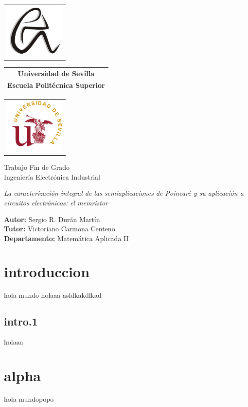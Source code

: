 \documentclass{article}
\begin{document}
	
	\begin{titlepage}
		\centering
		\hspace*{-1.5cm}\begin{tabular}{@{}l@{}}
			\includegraphics[width=3cm]{a.png} %
		\end{tabular}
		\hfill
		\begin{tabular}{c}
			\LARGE\textbf{Universidad de Sevilla} \\ [0.5cm] %
			\LARGE\textbf{Escuela Politécnica Superior} %
		\end{tabular}%
		\hfill
		\begin{tabular}{@{}r@{}}
			\includegraphics[width=3cm]{b.png} %
		\end{tabular}\hspace*{-1.5cm}
		
		\vspace{1.5cm}
		
		\begin{center}
			\Large\textmd{Trabajo Fin de Grado} \\ [0.5cm] %
			\Large\textmd{Ingeniería Electrónica Industrial}
		\end{center}
		
		\vspace{2cm}
		
		\begin{center}
			\LARGE\textsl{La caracterización integral de las semiaplicaciones de Poincaré y su aplicación a circuitos electrónicos: el memristor}
		\end{center}
		
		\vspace{6cm}
		
		\raggedright
		\large\textbf{Autor:} Sergio R. Durán Martín \\ [0.5cm]
		\large\textbf{Tutor:} Victoriano Carmona Centeno \\ [0.5cm]
		\large\textbf{Departamento:} Matemática Aplicada II
	\end{titlepage}
	
	\newpage
	\section{introduccion}
	hola mundo
	\newpage
	holaaa
	\newpage
	asldkakdlkad
	\newpage
	\subsection{intro.1}
	holaaa
	\newpage
	\section{alpha}
	hola mundopopo
	
\end{document}
